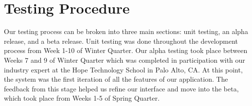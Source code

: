 \chapter{Testing Procedure}

Our testing process can be broken into three main sections: unit testing, an alpha release, and a beta release. Unit testing was done throughout the development process from Week 1-10 of Winter Quarter. Our alpha testing took place between Weeks 7 and 9 of Winter Quarter which was completed in participation with our industry expert at the Hope Technology School in Palo Alto, CA. At this point, the system was the first iteration of all the features of our application. The feedback from this stage helped us refine our interface and move into the beta, which took place from Weeks 1-5 of Spring Quarter.
